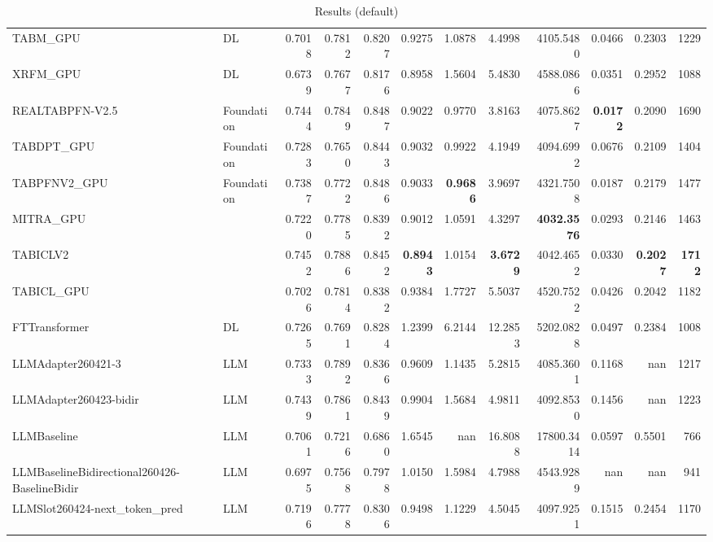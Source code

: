 \begin{table}[htbp]
{\begin{tabular}{ll|rrrrrrrrr|r}
TABM\_GPU & DL & 0.7018 & 0.7812 & 0.8207 & 0.9275 & 1.0878 & 4.4998 & 4105.5480 & 0.0466 & 0.2303 & 1229 \\
XRFM\_GPU & DL & 0.6739 & 0.7677 & 0.8176 & 0.8958 & 1.5604 & 5.4830 & 4588.0866 & 0.0351 & 0.2952 & 1088 \\
REALTABPFN-V2.5 & Foundation & 0.7444 & 0.7849 & 0.8487 & 0.9022 & 0.9770 & 3.8163 & 4075.8627 & \textbf{0.0172} & 0.2090 & 1690 \\
TABDPT\_GPU & Foundation & 0.7283 & 0.7650 & 0.8443 & 0.9032 & 0.9922 & 4.1949 & 4094.6992 & 0.0676 & 0.2109 & 1404 \\
TABPFNV2\_GPU & Foundation & 0.7387 & 0.7722 & 0.8486 & 0.9033 & \textbf{0.9686} & 3.9697 & 4321.7508 & 0.0187 & 0.2179 & 1477 \\
MITRA\_GPU &  & 0.7220 & 0.7785 & 0.8392 & 0.9012 & 1.0591 & 4.3297 & \textbf{4032.3576} & 0.0293 & 0.2146 & 1463 \\
TABICLV2 &  & 0.7452 & 0.7886 & 0.8452 & \textbf{0.8943} & 1.0154 & \textbf{3.6729} & 4042.4652 & 0.0330 & \textbf{0.2027} & \textbf{1712} \\
TABICL\_GPU &  & 0.7026 & 0.7814 & 0.8382 & 0.9384 & 1.7727 & 5.5037 & 4520.7522 & 0.0426 & 0.2042 & 1182 \\
\midrule
FTTransformer & DL & 0.7265 & 0.7691 & 0.8284 & 1.2399 & 6.2144 & 12.2853 & 5202.0828 & 0.0497 & 0.2384 & 1008 \\
LLMAdapter260421-3 & LLM & 0.7333 & 0.7892 & 0.8366 & 0.9609 & 1.1435 & 5.2815 & 4085.3601 & 0.1168 & nan & 1217 \\
LLMAdapter260423-bidir & LLM & 0.7439 & 0.7861 & 0.8439 & 0.9904 & 1.5684 & 4.9811 & 4092.8530 & 0.1456 & nan & 1223 \\
LLMBaseline & LLM & 0.7061 & 0.7216 & 0.6860 & 1.6545 & nan & 16.8088 & 17800.3414 & 0.0597 & 0.5501 & 766 \\
LLMBaselineBidirectional260426-BaselineBidir & LLM & 0.6975 & 0.7568 & 0.7978 & 1.0150 & 1.5984 & 4.7988 & 4543.9289 & nan & nan & 941 \\
LLMSlot260424-next\_token\_pred & LLM & 0.7196 & 0.7778 & 0.8306 & 0.9498 & 1.1229 & 4.5045 & 4097.9251 & 0.1515 & 0.2454 & 1170 \\
\bottomrule
\end{tabular}
}
\caption{Results (default)}
\label{tab:results_default}
\end{table}